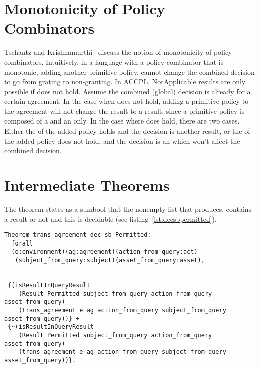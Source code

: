 \section{Monotonicity of Policy Combinators}

Tschantz and Krishnamurthi~\cite{Tschantz} discuss the notion of monotonicity of policy combinators. Intuitively, in a language with a policy combinator that is monotonic, adding another primitive policy, cannot change the combined decision to go from grating to non-granting. In \ac{ACCPL}, NotApplicable results are only possible if  does not hold. Assume the combined (global) decision is already  for a certain agreement. In the case when  does not hold, adding a primitive policy to the agreement will not change the  result to a  result, since a primitive policy is composed of a  and an  only. In the case where  does hold, there are two cases. Either the  of the added policy holds and the decision is another  result, or the  of the added policy does not hold, and the decision is an  which won't affect the combined decision.





\section{Intermediate Theorems}\label{sec:intermediatetheorems}
The theorem  states as a sumbool that the nonempty list that  produces, contains a  result or not and this is decidable (see listing~\ref{lst:decsbpermitted}).


\begin{lstlisting}
Theorem trans_agreement_dec_sb_Permitted:
  forall
  (e:environment)(ag:agreement)(action_from_query:act)
   (subject_from_query:subject)(asset_from_query:asset),


 {(isResultInQueryResult 
    (Result Permitted subject_from_query action_from_query asset_from_query)
    (trans_agreement e ag action_from_query subject_from_query asset_from_query))} +
 {~(isResultInQueryResult 
    (Result Permitted subject_from_query action_from_query asset_from_query)
    (trans_agreement e ag action_from_query subject_from_query asset_from_query))}.

\end{lstlisting}

